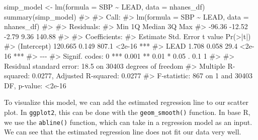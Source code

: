 \documentclass[
  letterpaper,
]{latex/krantz}
\makeatletter
\newenvironment{Shaded}{\begin{snugshade}}{\end{snugshade}}
\newcommand{\AttributeTok}[1]{\textcolor[rgb]{0.40,0.45,0.13}{#1}}
\newcommand{\CommentTok}[1]{\textcolor[rgb]{0.37,0.37,0.37}{#1}}
\newcommand{\DecValTok}[1]{\textcolor[rgb]{0.68,0.00,0.00}{#1}}
\newcommand{\FunctionTok}[1]{\textcolor[rgb]{0.28,0.35,0.67}{#1}}
\newcommand{\NormalTok}[1]{\textcolor[rgb]{0.00,0.23,0.31}{#1}}
\newcommand{\OtherTok}[1]{\textcolor[rgb]{0.00,0.23,0.31}{#1}}
\newcommand{\SpecialCharTok}[1]{\textcolor[rgb]{0.37,0.37,0.37}{#1}}
\newcommand{\StringTok}[1]{\textcolor[rgb]{0.13,0.47,0.30}{#1}}
\newenvironment{kframe}{%
\medskip{}
\setlength{\fboxsep}{.8em}
 \def\at@end@of@kframe{}%
 \ifinner\ifhmode%
  \def\at@end@of@kframe{\end{minipage}}%
  \begin{minipage}{\columnwidth}%
 \fi\fi%
 \def\FrameCommand##1{\hskip\@totalleftmargin \hskip-\fboxsep
 \colorbox{shadecolor}{##1}\hskip-\fboxsep
     \hskip-\linewidth \hskip-\@totalleftmargin \hskip\columnwidth}%
 \MakeFramed {\advance\hsize-\width
   \@totalleftmargin\z@ \linewidth\hsize
   \@setminipage}}%
 {\par\unskip\endMakeFramed%
 \at@end@of@kframe}
\renewenvironment{Shaded}{\begin{kframe}}{\end{kframe}}
\makeatother
\begin{document}
\begin{Shaded}
\begin{Highlighting}[]
\NormalTok{simp\_model }\OtherTok{\textless{}{-}} \FunctionTok{lm}\NormalTok{(}\AttributeTok{formula =}\NormalTok{ SBP }\SpecialCharTok{\textasciitilde{}}\NormalTok{ LEAD, }\AttributeTok{data =}\NormalTok{ nhanes\_df)}
\FunctionTok{summary}\NormalTok{(simp\_model)}
\CommentTok{\#\textgreater{} }
\CommentTok{\#\textgreater{} Call:}
\CommentTok{\#\textgreater{} lm(formula = SBP \textasciitilde{} LEAD, data = nhanes\_df)}
\CommentTok{\#\textgreater{} }
\CommentTok{\#\textgreater{} Residuals:}
\CommentTok{\#\textgreater{}    Min     1Q Median     3Q    Max }
\CommentTok{\#\textgreater{} {-}96.36 {-}12.52  {-}2.79   9.36 140.88 }
\CommentTok{\#\textgreater{} }
\CommentTok{\#\textgreater{} Coefficients:}
\CommentTok{\#\textgreater{}             Estimate Std. Error t value Pr(\textgreater{}|t|)    }
\CommentTok{\#\textgreater{} (Intercept)  120.665      0.149   807.1   \textless{}2e{-}16 ***}
\CommentTok{\#\textgreater{} LEAD           1.708      0.058    29.4   \textless{}2e{-}16 ***}
\CommentTok{\#\textgreater{} {-}{-}{-}}
\CommentTok{\#\textgreater{} Signif. codes:  0 \textquotesingle{}***\textquotesingle{} 0.001 \textquotesingle{}**\textquotesingle{} 0.01 \textquotesingle{}*\textquotesingle{} 0.05 \textquotesingle{}.\textquotesingle{} 0.1 \textquotesingle{} \textquotesingle{} 1}
\CommentTok{\#\textgreater{} }
\CommentTok{\#\textgreater{} Residual standard error: 18.5 on 30403 degrees of freedom}
\CommentTok{\#\textgreater{} Multiple R{-}squared:  0.0277, Adjusted R{-}squared:  0.0277 }
\CommentTok{\#\textgreater{} F{-}statistic:  867 on 1 and 30403 DF,  p{-}value: \textless{}2e{-}16}
\end{Highlighting}
\end{Shaded}

To visualize this model, we can add the estimated regression line to our
scatter plot. In \texttt{ggplot2}, this can be done with the
\texttt{geom\_smooth()} function. In base R, we use the
\texttt{abline()}
function, which can take
in a regression model as an input. We can see that the estimated
regression line does not fit our data very well.

\begin{Shaded}
\end{Shaded}
\end{document}
